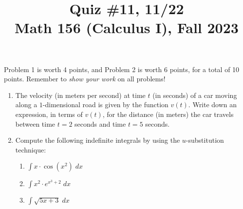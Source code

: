 \documentclass[11pt]{article}
\title{Quiz \#11, 11/22 \\ Math 156 (Calculus I), Fall 2023}
\date{}
\begin{document}
\maketitle

\thispagestyle{empty}

\vspace{-1.75cm}

Problem 1 is worth 4 points, and Problem 2 is worth 6 points, for a total of 10 points. Remember to \emph{show your work} on all problems!

\begin{enumerate}
\item The velocity (in meters per second) at time $t$ (in seconds) of a car moving along a $1$-dimensional road is given by the function $v(t)$. Write down an expression, in terms of $v(t)$, for the distance (in meters) the car travels between time $t=2$ seconds and time $t=5$ seconds.

\vspace{3.5cm}

\item Compute the following indefinite integrals by using the $u$-substitution technique:
\begin{enumerate}
\item $\int x\cdot \cos(x^2) \; dx$
\item $\int x^2 \cdot e^{x^3+2} \; dx$
\item $\int \sqrt{5x+3} \; dx$
\end{enumerate}

\end{enumerate}
\end{document}
